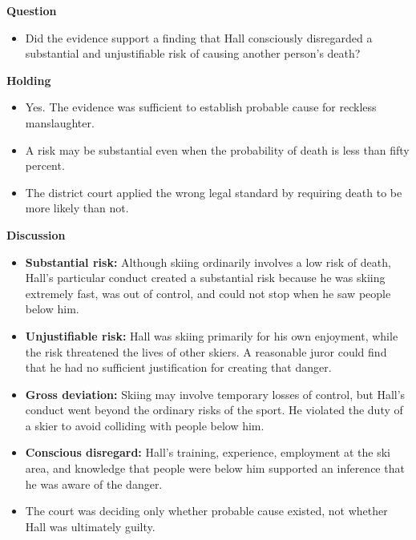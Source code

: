 \documentclass[11pt]{tex/lawoutline}
\begin{document}
{        \textbf{Question}
        \begin{itemize}
            \item Did the evidence support a finding that Hall consciously disregarded a substantial and unjustifiable risk of causing another person's death?
        \end{itemize}

        \textbf{Holding}
        \begin{itemize}
            \item Yes. The evidence was sufficient to establish probable cause for reckless manslaughter.
            \item A risk may be substantial even when the probability of death is less than fifty percent.
            \item The district court applied the wrong legal standard by requiring death to be more likely than not.
        \end{itemize}

        \textbf{Discussion}
        \begin{itemize}
            \item \textbf{Substantial risk:} Although skiing ordinarily involves a low risk of death, Hall's particular conduct created a substantial risk because he was skiing extremely fast, was out of control, and could not stop when he saw people below him.
            \item \textbf{Unjustifiable risk:} Hall was skiing primarily for his own enjoyment, while the risk threatened the lives of other skiers. A reasonable juror could find that he had no sufficient justification for creating that danger.
            \item \textbf{Gross deviation:} Skiing may involve temporary losses of control, but Hall's conduct went beyond the ordinary risks of the sport. He violated the duty of a skier to avoid colliding with people below him.
            \item \textbf{Conscious disregard:} Hall's training, experience, employment at the ski area, and knowledge that people were below him supported an inference that he was aware of the danger.
            \item The court was deciding only whether probable cause existed, not whether Hall was ultimately guilty.
        \end{itemize}
    }
\end{document}
